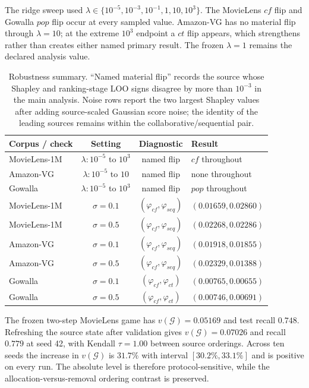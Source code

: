 \documentclass[10pt]{article}
\newcommand{\G}{\mathcal{G}}
\begin{document}
The ridge sweep used
$\lambda\in\{10^{-5},10^{-3},10^{-1},1,10,10^3\}$. The MovieLens $cf$ flip
and Gowalla $pop$ flip occur at every sampled value. Amazon-VG has no material
flip through $\lambda=10$; at the extreme $10^3$ endpoint a $ct$ flip appears,
which strengthens rather than creates either named primary result. The frozen
$\lambda=1$ remains the declared analysis value.

\begin{table}[H]
\centering
\small
\caption{Robustness summary. ``Named material flip'' records the source whose
Shapley and ranking-stage LOO signs disagree by more than $10^{-3}$ in the main
analysis. Noise rows report the two largest Shapley values after adding
source-scaled Gaussian score noise; the identity of the leading sources remains
within the collaborative/sequential pair.}
\label{tab:robustness}
\small
\begin{tabularx}{\textwidth}{@{}lcc>{\raggedright\arraybackslash}X@{}}
\toprule
Corpus / check & Setting & Diagnostic & Result \\
\midrule
MovieLens-1M & $\lambda:10^{-5}$ to $10^3$ & named flip & $cf$ throughout \\
Amazon-VG & $\lambda:10^{-5}$ to $10$ & named flip & none throughout \\
Gowalla & $\lambda:10^{-5}$ to $10^3$ & named flip & $pop$ throughout \\
MovieLens-1M & $\sigma=0.1$ & $(\varphi_{cf},\varphi_{seq})$ & $(0.01659,0.02860)$ \\
MovieLens-1M & $\sigma=0.5$ & $(\varphi_{cf},\varphi_{seq})$ & $(0.02268,0.02286)$ \\
Amazon-VG & $\sigma=0.1$ & $(\varphi_{cf},\varphi_{seq})$ & $(0.01918,0.01855)$ \\
Amazon-VG & $\sigma=0.5$ & $(\varphi_{cf},\varphi_{seq})$ & $(0.02329,0.01388)$ \\
Gowalla & $\sigma=0.1$ & $(\varphi_{cf},\varphi_{ct})$ & $(0.00765,0.00655)$ \\
Gowalla & $\sigma=0.5$ & $(\varphi_{cf},\varphi_{ct})$ & $(0.00746,0.00691)$ \\
\bottomrule
\end{tabularx}
\end{table}

The frozen two-step MovieLens game has $v(\G)=0.05169$ and test recall $0.748$.
Refreshing the source state after validation gives $v(\G)=0.07026$ and recall
$0.779$ at seed 42, with Kendall $\tau=1.00$ between source orderings. Across
ten seeds the increase in $v(\G)$ is $31.7\%$ with interval
$[30.2\%,33.1\%]$ and is positive on every run. The absolute level is therefore
protocol-sensitive, while the allocation-versus-removal ordering contrast is
preserved.
\end{document}
